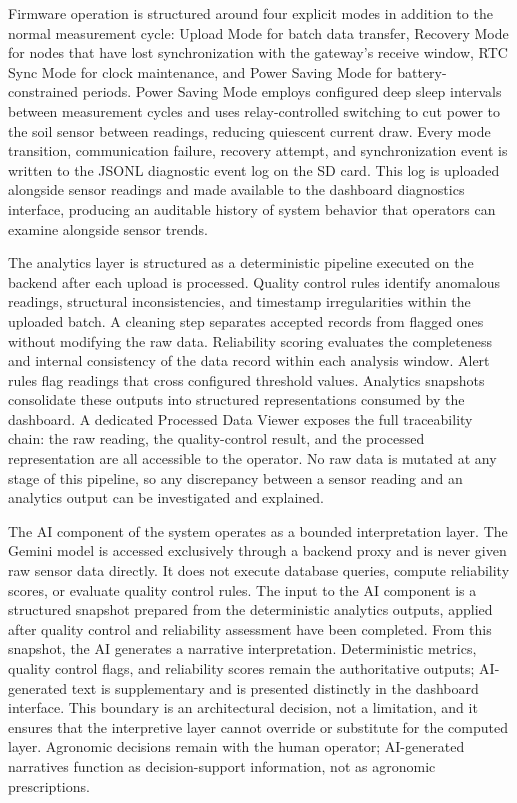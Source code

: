 Firmware operation is structured around four explicit modes in addition to the
normal measurement cycle: Upload Mode for batch data transfer, Recovery Mode
for nodes that have lost synchronization with the gateway's receive window, RTC
Sync Mode for clock maintenance, and Power Saving Mode for battery-constrained
periods. Power Saving Mode employs configured deep sleep intervals between
measurement cycles and uses relay-controlled switching to cut power to the
soil sensor between readings, reducing quiescent current draw. Every mode
transition, communication failure, recovery attempt, and synchronization event
is written to the JSONL diagnostic event log on the SD card. This log is
uploaded alongside sensor readings and made available to the dashboard
diagnostics interface, producing an auditable history of system behavior that
operators can examine alongside sensor trends.

The analytics layer is structured as a deterministic pipeline executed on the
backend after each upload is processed. Quality control rules identify
anomalous readings, structural inconsistencies, and timestamp irregularities
within the uploaded batch. A cleaning step separates accepted records from
flagged ones without modifying the raw data. Reliability scoring evaluates the
completeness and internal consistency of the data record within each analysis
window. Alert rules flag readings that cross configured threshold values.
Analytics snapshots consolidate these outputs into structured representations
consumed by the dashboard. A dedicated Processed Data Viewer exposes the full
traceability chain: the raw reading, the quality-control result, and the
processed representation are all accessible to the operator. No raw data is
mutated at any stage of this pipeline, so any discrepancy between a sensor
reading and an analytics output can be investigated and explained.

The AI component of the system operates as a bounded interpretation layer.
The Gemini model is accessed exclusively through a backend proxy and is never
given raw sensor data directly. It does not execute database queries, compute
reliability scores, or evaluate quality control rules. The input to the AI
component is a structured snapshot prepared from the deterministic analytics
outputs, applied after quality control and reliability assessment have been
completed. From this snapshot, the AI generates a narrative interpretation.
Deterministic metrics, quality control flags, and reliability scores remain the
authoritative outputs; AI-generated text is supplementary and is presented
distinctly in the dashboard interface. This boundary is an architectural
decision, not a limitation, and it ensures that the interpretive layer cannot
override or substitute for the computed layer. Agronomic decisions remain with the human operator; AI-generated narratives function as decision-support information, not as agronomic prescriptions.

